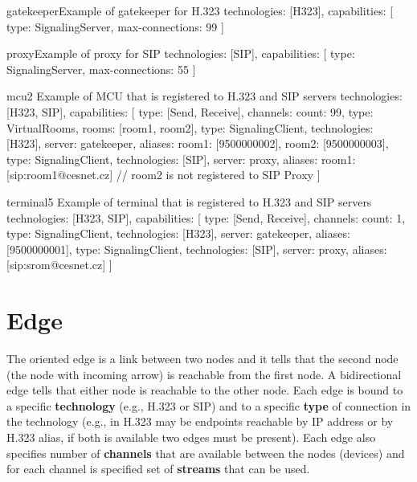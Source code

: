 \begin{itemize}
\begin{ResourceExample}{}{gatekeeper}{Example of gatekeeper for H.323}
technologies: [H323],
capabilities: [
  {type: SignalingServer, max-connections: 99}
]
\end{ResourceExample}

\begin{ResourceExample}{}{proxy}{Example of proxy for SIP}
technologies: [SIP],
capabilities: [
  {type: SignalingServer, max-connections: 55}
]
\end{ResourceExample}

\begin{ResourceExample}{}{mcu2}%
      {Example of MCU that is registered to H.323 and SIP servers}
technologies: [H323, SIP],
capabilities: [
  {type: [Send, Receive], channels: {count: 99}},
  {type: VirtualRooms, rooms: [room1, room2]},
  {type: SignalingClient, technologies: [H323], server: gatekeeper,
     aliases: {room1: [9500000002], room2: [9500000003]}},
  {type: SignalingClient, technologies: [SIP], server: proxy,
     aliases: {room1: [sip:room1@cesnet.cz]}} 
     // room2 is not registered to SIP Proxy
]
\end{ResourceExample}

\begin{ResourceExample}{}{terminal5}%
      {Example of terminal that is registered to H.323 and SIP servers}
technologies: [H323, SIP],
capabilities: [
  {type: [Send, Receive], channels: {count: 1}},
  {type: SignalingClient, technologies: [H323], server: gatekeeper,
     aliases: [9500000001]},
  {type: SignalingClient, technologies: [SIP], server: proxy,
     aliases: [sip:srom@cesnet.cz]}
]
\end{ResourceExample}

\end{itemize}
 

\section{Edge}

The oriented edge is a link between two nodes and it tells that the second 
node (the node with incoming arrow) is reachable from the first node. A 
bidirectional edge tells that either node is reachable to the other node. 
Each edge is bound to a specific \textbf{technology} (e.g., H.323 or SIP) and 
to a specific \textbf{type} of connection in the technology (e.g., in H.323 
may be endpoints reachable by IP address or by H.323 alias, if both is 
available two edges must be present). Each edge also specifies number of 
\textbf{channels} that are available between the nodes (devices) and for each 
channel is specified set of \textbf{streams} that can be used.

